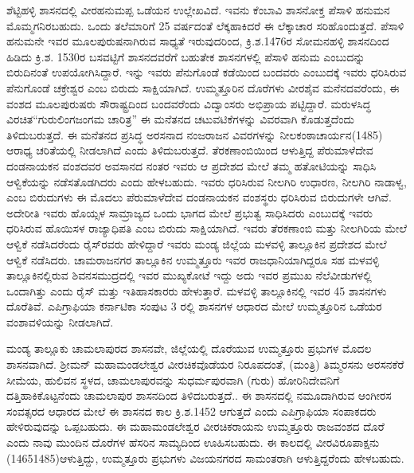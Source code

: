 ಶೆಟ್ಟಿಹಳ್ಳಿ ಶಾಸನದಲ್ಲಿ ವೀರಹನುಮಪ್ಪ ಒಡೆಯನ ಉಲ್ಲೇಖವಿದೆ. ಇವನು ಕೆಂಬಾವಿ ಶಾಸನೋಕ್ತ ಪೆಸಾಳಿ ಹನುಮನ ಮೊಮ್ಮಗನಿರಬಹುದು. ಒಂದು ತಲೆಮಾರಿಗೆ 25 ವರ್ಷದಂತೆ ಲೆಕ್ಕಹಾಕಿದರೆ ಈ ಲೆಕ್ಕಾಚಾರ ಸರಿಹೊಂದುತ್ತದೆ. ಪೆಸಾಳಿ ಹನುಮನೇ ಇವರ ಮೂಲಪುರುಷನಾಗಿರುವ ಸಾಧ್ಯತೆ ಇರುವುದರಿಂದ, ಕ್ರಿ.ಶ.1476ರ ಸೋಮನಹಳ್ಳಿ ಶಾಸನದಿಂದ ಹಿಡಿದು ಕ್ರಿ.ಶ. 1530ರ ಬಸವಟ್ಟಿಗೆ ಶಾಸನದವರೆಗೆ ಬಹುತೇಕ ಶಾಸನಗಳಲ್ಲಿ ಪೆಸಾಳಿ ಹನುಮ ಎಂಬುದನ್ನು ಬಿರುದಿನಂತೆ ಉಪಯೋಗಿಸಿದ್ದಾರೆ. ಇನ್ನು ಇವರು ಪೆನುಗೊಂಡೆ ಕಡೆಯಿಂದ ಬಂದವರು ಎಂಬುದಕ್ಕೆ ಇವರು ಧರಿಸಿರುವ ಪೆನುಗೊಂಡೆ ಚಕ್ರೇಶ್ವರ ಎಂಬ ಬಿರುದು ಸಾಕ್ಷಿಯಾಗಿದೆ. ಉಮ್ಮತ್ತೂರಿನ ದೊರೆಗಳು ವೀರಶೈವ ಮನೆನದವರೆಂದು, ಈ ವಂಶದ ಮೂಲಪುರುಷರು ಸೌರಾಷ್ಟ್ರದಿಂದ ಬಂದವರೆಂದು ವಿದ್ವಾಂಸರು ಅಭಿಪ್ರಾಯ ಪಟ್ಟಿದ್ದಾರೆ. ಮರುಳಸಿದ್ಧ ವಿರಚಿತ\break “ಗುರುಲಿಂಗಜಂಗಮ ಚಾರಿತ್ರ” ಈ ಮನೆತನದ ಚಟುವಟಿಕೆಗಳನ್ನು ವಿವರವಾಗಿ ಕೊಡುತ್ತದೆಂದು ತಿಳಿದುಬರುತ್ತದೆ. ಈ ಮನೆತನದ ಪ್ರಸಿದ್ಧ ಅರಸನಾದ ನಂಜರಾಜನ ವಿವರಗಳನ್ನು ನೀಲಕಂಠಾಚಾರ್ಯನ(1485) ಆರಾಧ್ಯ ಚರಿತೆಯಲ್ಲಿ ನೀಡಲಾಗಿದೆ ಎಂದು ತಿಳಿದುಬರುತ್ತದೆ. ತೆರಕಣಾಂಬಿಯಿಂದ ಆಳುತ್ತಿದ್ದ ಪೆರುಮಾಳೆದೇವ ದಂಡನಾಯಕನ ವಂಶದವರ ಅವಸಾನದ ನಂತರ ಇವರು ಆ ಪ್ರದೇಶದ ಮೇಲೆ ತಮ್ಮ ಹತೋಟಿಯನ್ನು ಸಾಧಿಸಿ ಆಳ್ವಿಕೆಯನ್ನು ನಡೆಸತೊಡಗಿದರು ಎಂದು ಹೇಳಬಹುದು. ಇವರು ಧರಿಸಿರುವ ನೀಲಗಿರಿ ಉಧಾರಣ, ನೀಲಗಿರಿ ನಾಡಾಳ್ವ, ಎಂಬ ಬಿರುದುಗಳು ಈ ಮೊದಲು ಪೆರುಮಾಳೆದೇವ ದಂಡನಾಯಕನ ವಂಶಸ್ಥರು ಧರಿಸಿರುವ ಬಿರುದುಗಳೇ ಆಗಿವೆ. ಅದೇರೀತಿ ಇವರು ಹೊಯ್ಸಳ ಸಾಮ್ರಾಜ್ಯದ ಒಂದು ಭಾಗದ ಮೇಲೆ ಪ್ರಭುತ್ವ ಸಾಧಿಸಿದರು ಎಂಬುದಕ್ಕೆ ಇವರು ಧರಿಸಿರುವ ಹೊಯಿಸಳ ರಾಜ್ಯಾಧಿಪತಿ ಎಂಬ ಬಿರುದು ಸಾಕ್ಷಿಯಾಗಿದೆ. ಇವರು ತೆರಕಣಾಂಬಿ ಮತ್ತು ನೀಲಗಿರಿಯ ಮೇಲೆ ಆಳ್ವಿಕೆ ನಡೆಸಿದರೆಂದು ರೈಸ್​ರವರು ಹೇಳಿದ್ದಾರೆ ಇವರು ಮಂಡ್ಯ ಜಿಲ್ಲೆಯ ಮಳವಳ್ಳಿ ತಾಲ್ಲೂಕಿನ ಪ್ರದೇಶದ ಮೇಲೆ ಆಳ್ವಿಕೆ ನಡೆಸಿದರು. ಚಾಮರಾಜನಗರ ತಾಲ್ಲೂಕಿನ ಉಮ್ಮತ್ತೂರು ಇವರ ರಾಜಧಾನಿಯಾಗಿದ್ದರೂ ಸಹ ಮಳವಳ್ಳಿ ತಾಲ್ಲೂಕಿನಲ್ಲಿರುವ ಶಿವನಸಮುದ್ರದಲ್ಲಿ ಇವರ ಮುಖ್ಯಕೋಟೆ ಇದ್ದು ಅದು ಇವರ ಪ್ರಮುಖ ನೆಲೆವೀಡುಗಳಲ್ಲಿ ಒಂದಾಗಿತ್ತು ಎಂದು ರೈಸ್​ ಮತ್ತು ಇತಿಹಾಸಕಾರರು ಹೇಳುತ್ತಾರೆ. ಮಳವಳ್ಳಿ ತಾಲ್ಲೂಕಿನಲ್ಲಿ ಇವರ 45 ಶಾಸನಗಳು ದೊರೆತಿವೆ. ಎಪಿಗ್ರಾಫಿಯಾ ಕರ್ನಾಟಿಕಾ ಸಂಪುಟ 3 ರಲ್ಲಿ ಶಾಸನಗಳ ಆಧಾರದ ಮೇಲೆ ಉಮ್ಮತ್ತೂರಿನ ಒಡೆಯರ ವಂಶಾವಳಿಯನ್ನು ನೀಡಲಾಗಿದೆ. 

ಮಂಡ್ಯ ತಾಲ್ಲೂಕು ಚಾಮಲಾಪುರದ ಶಾಸನವೇ, ಜಿಲ್ಲೆಯಲ್ಲಿ ದೊರೆಯುವ ಉಮ್ಮತ್ತೂರು ಪ್ರಭುಗಳ ಮೊದಲ ಶಾಸನವಾಗಿದೆ. ಶ‍್ರೀಮನ್​ ಮಹಾಮಂಡಲೇಶ್ವರ ವೀರಚಿಕವೊಡೆಯರ ನಿರೂಪದಂತೆ, (ಮಂತ್ರಿ) ತಿಮ್ಮರಸನು ಅರಸನಕೆರೆ ಸೀಮೆಯ, ಹುಲಿವನ ಸ್ಥಳದ, ಚಾಮಲಾಪುರವನ್ನು ಸುಧರ್ಮಪುರವಾಗಿ (ಗುರು) ಹೋರಿನಿದೇವನಿಗೆ ದತ್ತಿಹಾಕಿಕೊಟ್ಟನೆಂದು ಚಾಮಲಾಪುರ ಶಾಸನದಿಂದ ತಿಳಿದಬರುತ್ತದೆ.. ಈ ಶಾಸನದಲ್ಲಿ ನಮೂದಾಗಿರುವ ಆಂಗೀರಸ ಸಂವತ್ಸರದ ಆಧಾರದ ಮೇಲೆ ಈ ಶಾಸನದ ಕಾಲ ಕ್ರಿ.ಶ.1452 ಆಗುತ್ತದೆ ಎಂದು ಎಪಿಗ್ರಾಫಿಯಾ ಸಂಪಾಕದರು ಹೇಳಿರುವುದನ್ನು ಒಪ್ಪಬಹುದು. ಈ ಮಹಾಮಂಡಲೇಶ್ವರ ವೀರಚಿಕರಾಯನು ಉಮ್ಮತ್ತೂರು ರಾಜವಂಶದ ದೊರೆ ಎಂದು ನಾವು ಮುಂದಿನ ದೊರೆಗಳ ಹೆಸರಿನ ಸಾಮ್ಯದಿಂದ ಊಹಿಸಬಹುದು. ಈ ಕಾಲದಲ್ಲಿ ವೀರವಿರೂಪಾಕ್ಷನು (14651485)ಆಳುತ್ತಿದ್ದು, ಉಮ್ಮತ್ತೂರು ಪ್ರಭುಗಳು ವಿಜಯನಗರದ ಸಾಮಂತರಾಗಿ ಆಳುತ್ತಿದ್ದರೆಂದು ಹೇಳಬಹುದು. 

